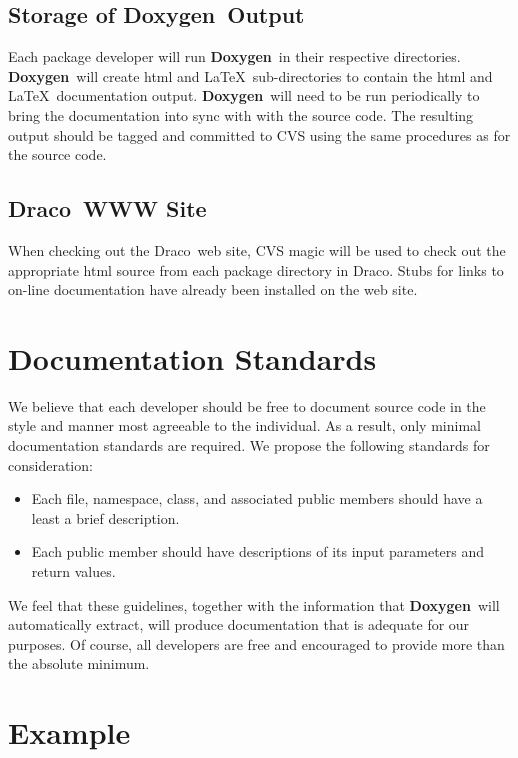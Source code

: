 \documentclass[11pt]{nmemo}
\newcommand{\draco}{{\normalfont\sffamily Draco}}
\newcommand{\doxy}{{\normalfont\bfseries Doxygen}}
\begin{document}
\subsection{Storage of \doxy\ Output}

Each package developer will run \doxy\ in their respective
directories.  \doxy\ will create html and \LaTeX\ sub-directories to
contain the html and \LaTeX\ documentation output. \doxy\ will need to
be run periodically to bring the documentation into sync with with the
source code. The resulting output should be tagged and committed to
CVS using the same procedures as for the source code.

\subsection{\draco\ WWW Site}

When checking out the \draco\ web site, CVS magic will be used to
check out the appropriate html source from each package directory in
\draco. Stubs for links to on-line documentation have already been
installed on the web site.

\section{Documentation Standards}

We believe that each developer should be free to document source code
in the style and manner most agreeable to the individual. As a result,
only minimal documentation standards are required.  We propose the
following standards for consideration:

\begin{itemize}
\item Each file, namespace, class, and associated public members
  should have a least a brief description.
\item Each public member should have descriptions of its input
  parameters and return values.
\end{itemize}

We feel that these guidelines, together with the information that
\doxy\ will automatically extract, will produce documentation that is
adequate for our purposes. Of course, all developers are free and
encouraged to provide more than the absolute minimum.


\section{Example}
\end{document}
